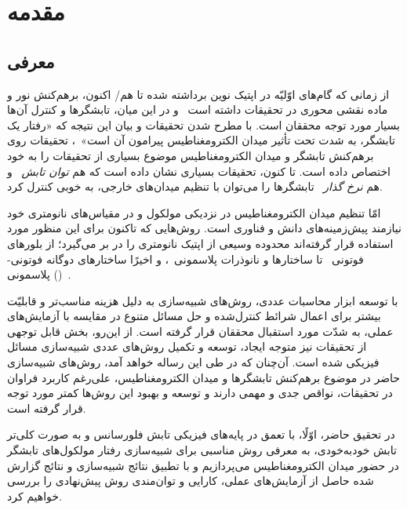 \chapter{مقدمه}\label{chap1}
\section{معرفی}
از زمانی که گام‌های اوّلیّه در اپتیک نوین برداشته شده تا هم/ اکنون، برهم‌کنش نور و ماده نقشی محوری در تحقیقات داشته است~\cite{FriskKockum2019} و در این میان، تابشگر‌ها و کنترل آن‌ها بسیار مورد توجه محققان است.
با مطرح شدن تحقیقات  و بیان این نتیجه که «رفتار یک تابشگر، به شدت تحت تأثیر میدان الکترومغناطیس پیرامون آن است»~\cite{Purcell1995,Pelton2015}، تحقیقات روی برهم‌کنش تابشگر و میدان الکترومغناطیس موضوع بسیاری از تحقیقات را به خود اختصاص داده است. تا کنون، تحقیقات بسیاری نشان داده است که هم \emph{توان تابش}~\cite{russell2012large} و هم \emph{نرخ گذار}~\cite{geddes2005radiative} تابشگرها را می‌توان با تنظیم میدان‌های خارجی، به خوبی کنترل کرد.

امّا تنظیم میدان الکترومغناطیس در نزدیکی مولکول و در مقیاس‌های نانومتری خود نیازمند پیش‌زمینه‌های دانش و فناوری است. روش‌هایی که تاکنون برای این منظور مورد استفاده قرار گرفته‌اند محدوده وسیعی از اپتیک نانومتری را در بر می‌گیرد؛ از بلورهای فوتونی~\cite{PhysRevLett.95.013904,Koenderink:05,doi:10.1021/acs.nanolett.7b05075} تا ساختارها و نانوذرات پلاسمونی~\cite{PhysRevLett.89.117401,ribeiro2017artefact}، و اخیرًا ساختارهای دوگانه فوتونی-پلاسمونی ()~\cite{shi2014coherent}.

با توسعه ابزار محاسبات عددی، روش‌های شبیه‌سازی به دلیل هزینه مناسب‌تر و قابلیّت بیشتر برای اعمال شرائط کنترل‌شده و حل مسائل متنوع در مقایسه با آزمایش‌های عملی، به شدّت مورد استقبال محققان قرار گرفته‌ است. از این‌رو، بخش قابل توجهی از تحقیقات نیز متوجه ایجاد، توسعه و تکمیل روش‌های عددی شبیه‌سازی مسائل فیزیکی شده است.
آن‌چنان که در طی این رساله خواهد آمد، روش‌های شبیه‌سازی حاضر در موضوع برهم‌کنش تابشگرها و میدان الکترومغناطیس، علی‌رغم کاربرد فراوان در تحقیقات، نواقص جدی و مهمی دارند و توسعه و بهبود این روش‌ها کمتر مورد توجه قرار گرفته است.

در تحقیق حاضر، اوّلًا، با تعمق در پایه‌های فیزیکی تابش فلورسانس و به صورت کلی‌تر تابش خودبه‌خودی، به معرفی روش مناسبی برای شبیه‌سازی رفتار مولکول‌های تابشگر در حضور میدان الکترومغناطیس  می‌پردازیم و با تطبیق نتائج شبیه‌سازی و نتائج گزارش شده حاصل از آزمایش‌های عملی، کارایی و توان‌مندی روش پیش‌نهادی را بررسی خواهیم کرد.

